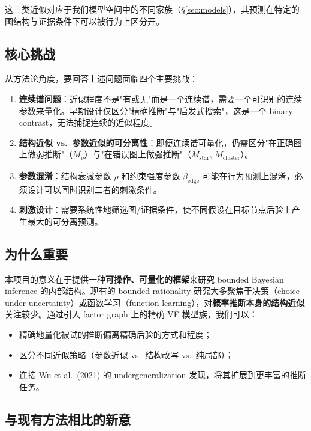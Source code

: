 \documentclass[11pt,a4paper]{ctexart}
\begin{document}
这三类近似对应于我们模型空间中的不同家族（§\ref{sec:models}），其预测在特定的图结构与证据条件下可以被行为上区分开。

\subsection{核心挑战}

从方法论角度，要回答上述问题面临四个主要挑战：

\begin{enumerate}
    \item \textbf{连续谱问题}：近似程度不是"有或无"而是一个连续谱，需要一个可识别的连续参数来量化。早期设计仅区分"精确推断"与"启发式搜索"，这是一个 binary contrast，无法捕捉连续的近似程度。
    \item \textbf{结构近似 vs.\ 参数近似的可分离性}：即便连续谱可量化，仍需区分"在正确图上做弱推断"（$M_\rho$）与"在错误图上做强推断"（$M_\mathrm{star}$, $M_\mathrm{cluster}$）。
    \item \textbf{参数混淆}：结构衰减参数 $\rho$ 和约束强度参数 $\beta_\mathrm{edge}$ 可能在行为预测上混淆，必须设计可以同时识别二者的刺激条件。
    \item \textbf{刺激设计}：需要系统性地筛选图/证据条件，使不同假设在目标节点后验上产生最大的可分离预测。
\end{enumerate}

\subsection{为什么重要}

本项目的意义在于提供一种\textbf{可操作、可量化的框架}来研究 bounded Bayesian inference 的内部结构。现有的 bounded rationality 研究大多聚焦于决策（choice under uncertainty）或函数学习（function learning），对\textbf{概率推断本身的结构近似}关注较少。通过引入 factor graph 上的精确 VE 模型族，我们可以：
\begin{itemize}
    \item 精确地量化被试的推断偏离精确后验的方式和程度；
    \item 区分不同近似策略（参数近似 vs.\ 结构改写 vs.\ 纯局部）；
    \item 连接 Wu et al.\ (2021) 的 undergeneralization 发现，将其扩展到更丰富的推断任务。
\end{itemize}

\subsection{与现有方法相比的新意}
\end{document}
